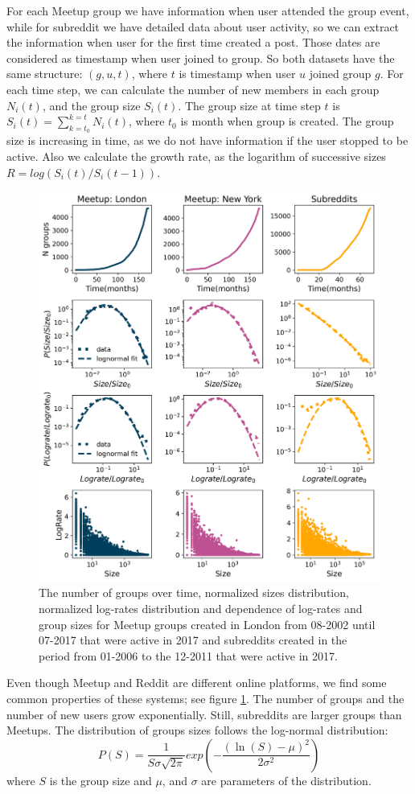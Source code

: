 For each Meetup group we have information when user attended the group event, while for subreddit we have detailed data about user activity, so we can extract the information when user for the first time created a post. Those dates are considered as timestamp when user joined to group. So both datasets have the same structure: $(g, u, t)$, where $t$ is timestamp when user $u$ joined group $g$. For each time step, we can calculate the number of new members in each group $N_i(t)$, and the group size $S_{i}(t)$. The group size at time step $t$ is $S_{i}(t)=\sum^{k=t}_{k=t_{0}}N_{i}(t)$, where $t_0$ is month when group is created. The group size is increasing in time, as we do not have information if the user stopped to be active. Also we calculate the growth rate, as the logarithm of successive sizes $R = log(S_{i}(t)/S_{i}(t-1))$.

\begin{figure}[h]
	\centering
	\includegraphics[width=0.8\linewidth]{Figures/figures/Fig2.png}
	\caption{The number of groups over time, normalized sizes distribution, normalized log-rates distribution and dependence of log-rates and group sizes for Meetup groups created in London from 08-2002 until 07-2017 that were active in 2017 and subreddits created in the period from 01-2006 to the  12-2011 that were active in 2017. }
	\label{fig:data1}
\end{figure}   

Even though Meetup and Reddit are different online platforms, we find some common properties of these systems; see figure \ref{fig:data1}. The number of groups and the number of new users grow exponentially. Still, subreddits are larger groups than Meetups. The distribution of groups sizes follows the log-normal distribution:
\begin{equation}
P(S)=\frac{1}{S\sigma\sqrt{2\pi}}exp(-\frac{(\ln(S)-\mu)^{2}}{2\sigma^{2}})
\label{eq:log}
\end{equation}
where $S$ is the group size and $\mu$, and $\sigma$ are parameters of the distribution.


